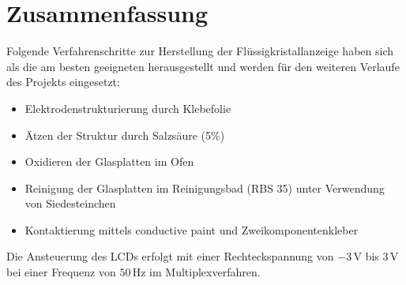 \section{Zusammenfassung}

Folgende Verfahrenschritte zur Herstellung der Flüssigkristallanzeige haben sich als die am besten geeigneten herausgestellt und werden für den weiteren Verlaufe des Projekts eingesetzt:

\begin{itemize}
\item Elektrodenstrukturierung durch Klebefolie
\item Ätzen der Struktur durch Salzsäure (5\%)
\item Oxidieren der Glasplatten im Ofen
\item Reinigung der Glasplatten im Reinigungsbad (RBS 35) unter Verwendung von Siedesteinchen
\item Kontaktierung mittels conductive paint und Zweikomponentenkleber\\
\end{itemize}

Die Ansteuerung des LCDs erfolgt mit
einer Rechteckspannung von \(-3\,\textrm{V}\) bis \(3\,\textrm{V}\)
bei einer Frequenz von \(50\,\textrm{Hz}\) im
Multiplexverfahren.